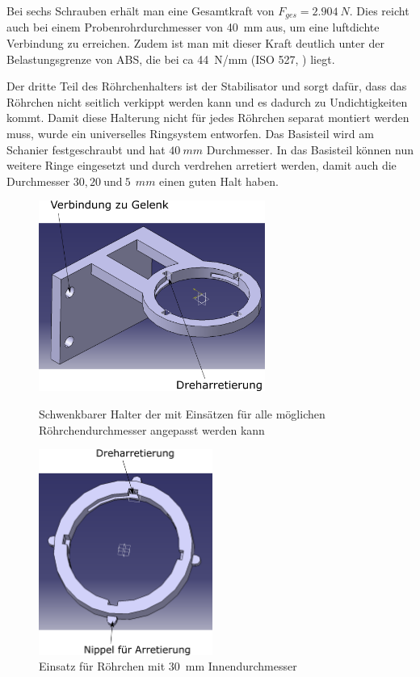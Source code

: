 Bei sechs Schrauben erhält man eine Gesamtkraft von $F_{ges} = \SI{2,904}{N}$. Dies reicht auch bei einem Probenrohrdurchmesser von \SI{40}{mm} aus, um eine luftdichte Verbindung zu erreichen. Zudem ist man mit dieser Kraft deutlich unter der Belastungsgrenze von ABS, die bei ca \SI{44}{N/mm} (ISO 527, \cite{C.Dallner2006, ThyssenPlastics}) liegt.

Der dritte Teil des Röhrchenhalters ist der Stabilisator und sorgt dafür, dass das Röhrchen nicht seitlich verkippt werden kann und es dadurch zu Undichtigkeiten kommt. Damit diese Halterung nicht für jedes Röhrchen separat montiert werden muss, wurde ein universelles Ringsystem entworfen. Das Basisteil wird am Schanier festgeschraubt und hat $\SI{40}{mm}$ Durchmesser. In das Basisteil können nun weitere Ringe eingesetzt und durch verdrehen arretiert werden, damit auch die Durchmesser $30,20  \ \text{und} \ 5\SI{}{\ mm}$ einen guten Halt haben.

	\begin{figure}[h!]
		\begin{minipage}[hbt]{7.4cm}
			\centering
			\includegraphics[width=7.4cm]{Basishalter.png}
			\caption[Röhrchenhalter oben]{Schwenkbarer Halter der mit Einsätzen für alle möglichen Röhrchendurchmesser angepasst werden kann}
		\end{minipage}
		\hfill
		\begin{minipage}[hbt]{5.7cm}
			\centering
			\includegraphics[width=5.7cm]{Basishalter_Einsatz.png}
			\caption[Röhrchenhalter Einsatz oben]{Einsatz für Röhrchen mit \SI{30}{mm} Innendurchmesser}
		\end{minipage}
	\end{figure}
	
